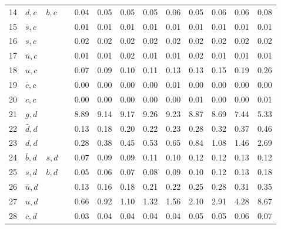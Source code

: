 \begin{tabularx}{\textwidth}{rXXX@{}S@{}S@{}S@{}S@{}S@{}S@{}S@{}S@{}S}
 14 & $d, c$           & $b, c$            &                  &  0.04 &  0.05 &  0.05 &  0.05 &  0.06 &  0.05 &  0.06 &  0.06 &  0.08 \\
 15 & $\bar s, c$      &                   &                  &  0.01 &  0.01 &  0.01 &  0.01 &  0.01 &  0.01 &  0.01 &  0.01 &  0.01 \\
 16 & $s, c$           &                   &                  &  0.02 &  0.02 &  0.02 &  0.02 &  0.02 &  0.02 &  0.02 &  0.02 &  0.02 \\
 17 & $\bar u, c$      &                   &                  &  0.01 &  0.01 &  0.02 &  0.01 &  0.01 &  0.02 &  0.01 &  0.01 &  0.01 \\
 18 & $u, c$           &                   &                  &  0.07 &  0.09 &  0.10 &  0.11 &  0.13 &  0.13 &  0.15 &  0.19 &  0.26 \\
 19 & $\bar c, c$      &                   &                  &  0.00 &  0.00 &  0.00 &  0.00 &  0.01 &  0.00 &  0.00 &  0.00 &  0.00 \\
 20 & $c, c$           &                   &                  &  0.00 &  0.00 &  0.00 &  0.00 &  0.00 &  0.01 &  0.00 &  0.00 &  0.01 \\
 21 & $g, d$           &                   &                  &  8.89 &  9.14 &  9.17 &  9.26 &  9.23 &  8.87 &  8.69 &  7.44 &  5.33 \\
 22 & $\bar d, d$      &                   &                  &  0.13 &  0.18 &  0.20 &  0.22 &  0.23 &  0.28 &  0.32 &  0.37 &  0.46 \\
 23 & $d, d$           &                   &                  &  0.28 &  0.38 &  0.45 &  0.53 &  0.65 &  0.84 &  1.08 &  1.46 &  2.69 \\
 24 & $\bar b, d$      & $\bar s, d$       &                  &  0.07 &  0.09 &  0.09 &  0.11 &  0.10 &  0.12 &  0.12 &  0.13 &  0.12 \\
 25 & $s, d$           & $b, d$            &                  &  0.05 &  0.06 &  0.07 &  0.08 &  0.09 &  0.10 &  0.12 &  0.13 &  0.18 \\
 26 & $\bar u, d$      &                   &                  &  0.13 &  0.16 &  0.18 &  0.21 &  0.22 &  0.25 &  0.28 &  0.31 &  0.35 \\
 27 & $u, d$           &                   &                  &  0.66 &  0.92 &  1.10 &  1.32 &  1.56 &  2.10 &  2.91 &  4.28 &  8.67 \\
 28 & $\bar c, d$      &                   &                  &  0.03 &  0.04 &  0.04 &  0.04 &  0.04 &  0.05 &  0.05 &  0.06 &  0.07 \\

\end{tabularx}
